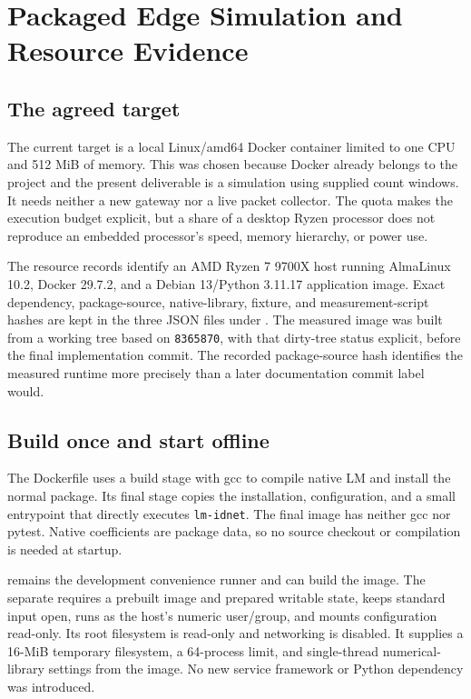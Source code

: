 \section{Packaged Edge Simulation and Resource Evidence}
\label{sec:edge}

\subsection{The agreed target}

The current target is a local Linux/amd64 Docker container limited to one CPU
and 512 MiB of memory. This was chosen because Docker already belongs to the
project and the present deliverable is a simulation using supplied count
windows. It needs neither a new gateway nor a live packet collector.
The quota makes the execution budget explicit, but a share of a desktop Ryzen
processor does not reproduce an embedded processor's speed, memory hierarchy,
or power use.

The resource records identify an AMD Ryzen 7 9700X host running AlmaLinux 10.2,
Docker 29.7.2, and a Debian 13/Python 3.11.17 application image. Exact dependency,
package-source, native-library, fixture, and measurement-script hashes are kept
in the three JSON files under . The measured image was built
from a working tree based on \texttt{8365870}, with that dirty-tree status
explicit, before the final implementation commit. The recorded package-source
hash identifies the measured runtime more precisely than a later documentation
commit label would.

\subsection{Build once and start offline}

The Dockerfile uses a build stage with gcc to compile native LM and install the
normal package. Its final stage copies the installation, configuration, and a
small entrypoint that directly executes \texttt{lm-idnet}. The final image has
neither gcc nor pytest. Native coefficients are package data, so no source
checkout or compilation is needed at startup.

 remains the development convenience runner and can build
the image. The separate  requires a prebuilt image
and prepared writable state, keeps standard input open, runs as the host's
numeric user/group, and mounts configuration read-only.
Its root filesystem is read-only and networking is disabled.
It supplies a 16-MiB temporary filesystem, a 64-process limit, and single-thread
numerical-library settings from the image. No new service framework or Python
dependency was introduced.

